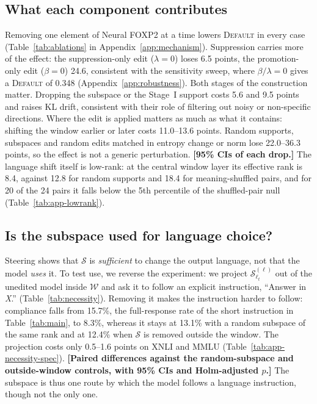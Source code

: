 \documentclass[11pt]{article}
\newcommand{\res}[1]{\textcolor{red!70!black}{\textbf{[#1]}}}
\newcommand{\foxp}{Neural FOXP2\xspace}
\newcommand{\default}{\textsc{Default}\xspace}
\begin{document}
\subsection{What each component contributes}
\label{subsec:ablations}


Removing one element of \foxp at a time lowers \default in every case (Table~\ref{tab:ablations} in Appendix~\ref{app:mechanism}). Suppression carries more of the effect: the suppression-only edit ($\lambda{=}0$) loses 6.5 points, the promotion-only edit ($\beta{=}0$) 24.6, consistent with the sensitivity sweep, where $\beta/\lambda{=}0$ gives a \default of 0.348 (Appendix~\ref{app:robustness}). Both stages of the construction matter. Dropping the subspace or the Stage~I support costs 5.6 and 9.5 points and raises KL drift, consistent with their role of filtering out noisy or non-specific directions. Where the edit is applied matters as much as what it contains: shifting the window earlier or later costs 11.0--13.6 points. Random supports, subspaces and random edits matched in entropy change or norm lose 22.0--36.3 points, so the effect is not a generic perturbation. \res{95\% CIs of each drop.} The language shift itself is low-rank: at the central window layer its effective rank is 8.4, against 12.8 for random supports and 18.4 for meaning-shuffled pairs, and for 20 of the 24 pairs it falls below the 5th percentile of the shuffled-pair null (Table~\ref{tab:app-lowrank}).

\subsection{Is the subspace used for language choice?}
\label{subsec:necessity}

Steering shows that $\mathcal{S}$ is \emph{sufficient} to change the output language, not that the model \emph{uses} it. To test use, we reverse the experiment: we project $\mathcal{S}^{(\ell)}_{\ell_t}$ out of the unedited model inside $\mathcal{W}$ and ask it to follow an explicit instruction, ``Answer in \textit{X}.'' (Table~\ref{tab:necessity}). Removing it makes the instruction harder to follow: compliance falls from 15.7\%, the full-response rate of the short instruction in Table~\ref{tab:main}, to 8.3\%, whereas it stays at 13.1\% with a random subspace of the same rank and at 12.4\% when $\mathcal{S}$ is removed outside the window. The projection costs only 0.5--1.6 points on XNLI and MMLU (Table~\ref{tab:app-necessity-spec}). \res{Paired differences against the random-subspace and outside-window controls, with 95\% CIs and Holm-adjusted $p$.} The subspace is thus one route by which the model follows a language instruction, though not the only one.
\end{document}
